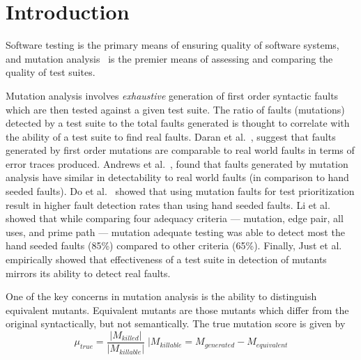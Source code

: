 \documentclass[conference]{IEEEtran}
\begin{document}
\newcommand*\per{\scalebox{.5}{\%}}

\setlength\tabcolsep{2pt}





\section{Introduction}

Software testing is the primary means of ensuring quality of software
systems, and mutation analysis~\cite{lipton1971fault,budd1979mutation} is the
premier means of assessing and comparing the quality of test suites. 

Mutation analysis involves \emph{exhaustive} generation of first order syntactic
faults which are then tested against a given test suite. The ratio of
faults (mutations) detected by a test suite to the total faults generated is thought
to correlate with the ability of a test suite to find real faults.
Daran et al.~\cite{daran1996software}, suggest that faults generated by
first order mutations are comparable to real world faults in terms of error
traces produced.  Andrews et al.~\cite{andrews2005mutation,andrews2006using},
found that faults generated by mutation analysis have similar in detectability
to real world faults (in comparison to hand seeded
faults). Do et al.~\cite{do2006on} showed that using mutation faults for test
prioritization result in higher fault detection rates than using hand seeded faults.
Li et al.~\cite{li2009experimental} showed that while comparing four adequacy
criteria --- mutation, edge pair, all uses, and prime path ---
mutation adequate testing was able to detect most the hand seeded faults (85\%)
compared to other criteria (65\%).
Finally, Just et al.~\cite{just2014mutants} empirically showed that
effectiveness of a test suite in detection of mutants mirrors its ability to
detect real faults.

One of the key concerns in mutation analysis is the ability to distinguish
equivalent mutants.
Equivalent mutants are those mutants which differ from the
original syntactically, but not semantically.
The true mutation score is given by
\[
\mu_{true} = \frac{|M_{killed}|}{|M_{killable}|}\; \bigg| M_{killable} = M_{generated} - M_{equivalent}
\]
\end{document}
